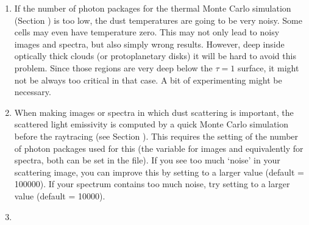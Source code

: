 \documentclass[letterpaper,10pt,english]{sphinxmanual}
\begin{document}
\begin{enumerate}
%
\item {} 

If the number of photon packages for the thermal Monte Carlo simulation
(Section {\hyperref[\detokenize{dustradtrans:sec-dust-thermal-monte-carlo}]{}}) is too low, the dust
temperatures are going to be very noisy. Some cells may even have temperature
zero. This may not only lead to noisy images and spectra, but also simply
wrong results. However, deep inside optically thick clouds (or protoplanetary
disks) it will be hard to avoid this problem.  Since those regions are very
deep below the \(\tau=1\) surface, it might not be always too critical in
that case. A bit of experimenting might be necessary.

\item {} 

When making images or spectra in which dust scattering is important, the
scattered light emissivity is computed by a quick Monte Carlo simulation
before the ray\sphinxhyphen{}tracing (see Section {\hyperref[\detokenize{dustradtrans:sec-scat-monte-carlo}]{}}). This
requires the setting of the number of photon packages used for this (the
variable  for images and equivalently  for
spectra, both can be set in the  file). If you see too much
‘noise’ in your scattering image, you can improve this by setting
 to a larger value (default = 100000). If your spectrum
contains too much noise, try setting  to a larger value
(default = 10000).

\item {} 


\end{enumerate}
\end{document}
